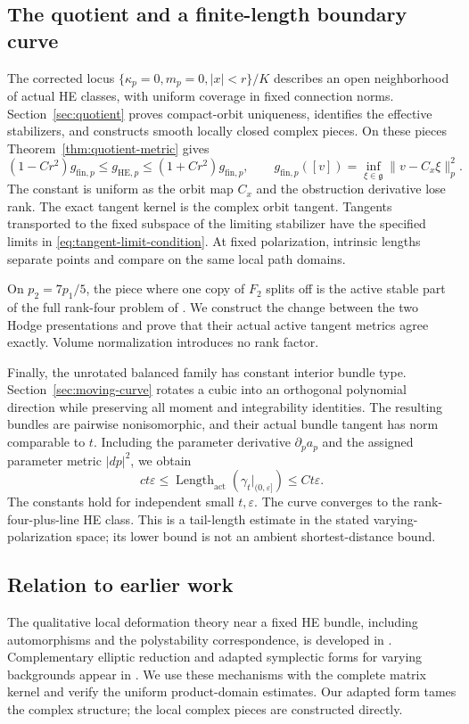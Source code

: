 \documentclass[11pt]{amsart}
\theoremstyle{definition}
\theoremstyle{remark}
\begin{document}
\subsection{The quotient and a finite-length boundary curve}
The corrected locus
$\{\kappa_p=0,m_p=0,|x|<r\}/K$ describes an open neighborhood
of actual HE classes, with uniform coverage in fixed connection norms.
Section~\ref{sec:quotient} proves compact-orbit uniqueness, identifies
the effective stabilizers, and constructs smooth locally closed complex
pieces. On these pieces Theorem~\ref{thm:quotient-metric} gives
\begin{equation}\label{eq:intro-quotient}
 (1-Cr^2)g_{\mathrm{fin},p}\le g_{\mathrm{HE},p}
                         \le(1+Cr^2)g_{\mathrm{fin},p},\qquad
 g_{\mathrm{fin},p}([v])=\inf_{\xi\in\mathfrak g}\|v-C_x\xi\|_p^2.
\end{equation}
The constant is uniform as the orbit map $C_x$ and the obstruction
derivative lose rank. The exact tangent kernel is the complex orbit
tangent. Tangents transported to the fixed subspace of the limiting
stabilizer have the specified limits in
\eqref{eq:tangent-limit-condition}. At fixed polarization, intrinsic
lengths separate points and compare on the same local path domains.

On $p_2=7p_1/5$, the piece where one copy of $F_2$ splits off
is the active stable part of the full rank-four problem of
\cite{WuebbenWallMetrics26}. We construct the change between the
two Hodge presentations and prove that their actual active tangent
metrics agree exactly. Volume normalization introduces no rank factor.

Finally, the unrotated balanced family has constant interior bundle
type. Section~\ref{sec:moving-curve} rotates a cubic into an orthogonal
polynomial direction while preserving all moment and integrability
identities. The resulting bundles are pairwise nonisomorphic, and their
actual bundle tangent has norm comparable to $t$. Including the
parameter derivative $\partial_pa_p$ and the assigned parameter metric
$|dp|^2$, we obtain
\[
 ct\varepsilon\le\operatorname{Length}_{\mathrm{act}}
      (\gamma_t|_{(0,\varepsilon]})\le Ct\varepsilon.
\]
The constants hold for independent small $t,\varepsilon$.
The curve converges to the rank-four-plus-line HE class. This is a
tail-length estimate in the stated varying-polarization space;
its lower bound is not an ambient shortest-distance bound.

\subsection{Relation to earlier work}
The qualitative local deformation theory near a fixed HE bundle,
including automorphisms and the polystability correspondence, is developed
in \cite{BuchdahlSchumacher20}. Complementary elliptic reduction and
adapted symplectic forms for varying backgrounds appear in
\cite{ClarkeTipler24,Delloque25}. We use these mechanisms with the
complete matrix kernel and verify the uniform product-domain estimates.
Our adapted form tames the complex structure; the local complex pieces
are constructed directly.
\end{document}
